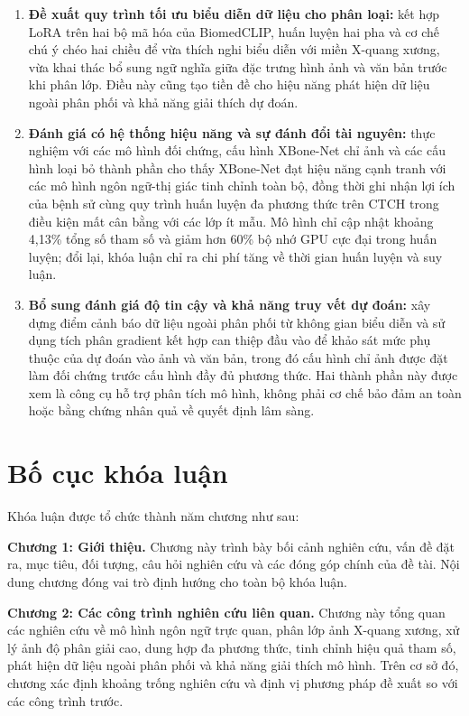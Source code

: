 \begin{enumerate}
    \item \textbf{Đề xuất quy trình tối ưu biểu diễn dữ liệu cho phân loại:} kết hợp LoRA trên hai bộ mã hóa của BiomedCLIP, huấn luyện hai pha và cơ chế chú ý chéo hai chiều để vừa thích nghi biểu diễn với miền X-quang xương, vừa khai thác bổ sung ngữ nghĩa giữa đặc trưng hình ảnh và văn bản trước khi phân lớp. Điều này cũng tạo tiền đề cho hiệu năng phát hiện dữ liệu ngoài phân phối và khả năng giải thích dự đoán.

    \item \textbf{Đánh giá có hệ thống hiệu năng và sự đánh đổi tài nguyên:} thực nghiệm với các mô hình đối chứng, cấu hình XBone-Net chỉ ảnh và các cấu hình loại bỏ thành phần cho thấy XBone-Net đạt hiệu năng cạnh tranh với các mô hình ngôn ngữ-thị giác tinh chỉnh toàn bộ, đồng thời ghi nhận lợi ích của bệnh sử cùng quy trình huấn luyện đa phương thức trên CTCH trong điều kiện mất cân bằng với các lớp ít mẫu. Mô hình chỉ cập nhật khoảng 4,13\% tổng số tham số và giảm hơn 60\% bộ nhớ GPU cực đại trong huấn luyện; đổi lại, khóa luận chỉ ra chi phí tăng về thời gian huấn luyện và suy luận.

    \item \textbf{Bổ sung đánh giá độ tin cậy và khả năng truy vết dự đoán:} xây dựng điểm cảnh báo dữ liệu ngoài phân phối từ không gian biểu diễn và sử dụng tích phân gradient kết hợp can thiệp đầu vào để khảo sát mức phụ thuộc của dự đoán vào ảnh và văn bản, trong đó cấu hình chỉ ảnh được đặt làm đối chứng trước cấu hình đầy đủ phương thức. Hai thành phần này được xem là công cụ hỗ trợ phân tích mô hình, không phải cơ chế bảo đảm an toàn hoặc bằng chứng nhân quả về quyết định lâm sàng.
\end{enumerate}

\section{Bố cục khóa luận}

Khóa luận được tổ chức thành năm chương như sau:

\textbf{Chương 1: Giới thiệu.} Chương này trình bày bối cảnh nghiên cứu, vấn đề đặt ra, mục tiêu, đối tượng, câu hỏi nghiên cứu và các đóng góp chính của đề tài. Nội dung chương đóng vai trò định hướng cho toàn bộ khóa luận.

\textbf{Chương 2: Các công trình nghiên cứu liên quan.} Chương này tổng quan các nghiên cứu về mô hình ngôn ngữ trực quan, phân lớp ảnh X-quang xương, xử lý ảnh độ phân giải cao, dung hợp đa phương thức, tinh chỉnh hiệu quả tham số, phát hiện dữ liệu ngoài phân phối và khả năng giải thích mô hình. Trên cơ sở đó, chương xác định khoảng trống nghiên cứu và định vị phương pháp đề xuất so với các công trình trước.

